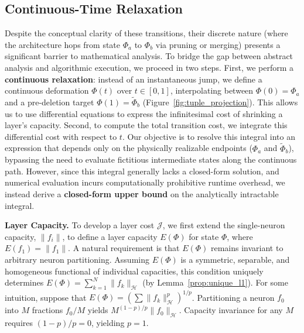 \documentclass[11pt, a4paper, copyright, gdm]{google}
\newcommand{\normshort}[1]{\lVert#1\rVert}
\newcommand{\calH}{\mathcal{H}}
\newcommand{\calJ}{\mathcal{J}}
\theoremstyle{definition}
\begin{document}
\subsection{Continuous-Time Relaxation}
Despite the conceptual clarity of these transitions, their discrete nature (where the architecture hops from state $\Phi_a$ to $\Phi_b$ via pruning or merging) presents a significant barrier to mathematical analysis. To bridge the gap between abstract analysis and algorithmic execution, we proceed in two steps. First, we perform a \textbf{continuous relaxation}: instead of an instantaneous jump, we define a continuous deformation $\Phi(t)$ over $t \in [0,1]$, interpolating between $\Phi(0) = \Phi_a$ and a pre-deletion target $\Phi(1) = \tilde{\Phi}_b$ (Figure~\ref{fig:tuple_projection}). This allows us to use differential equations to express the infinitesimal cost of shrinking a layer's capacity. Second, to compute the total transition cost, we integrate this differential cost with respect to $t$. Our objective is to resolve this integral into an expression that depends only on the physically realizable endpoints ($\Phi_a$ and $\tilde{\Phi}_b$), bypassing the need to evaluate fictitious intermediate states along the continuous path. However, since this integral generally lacks a closed-form solution, and numerical evaluation incurs computationally prohibitive runtime overhead, we instead derive a \textbf{closed-form upper bound} on the analytically intractable integral.

\noindent \textbf{Layer Capacity.} To develop a layer cost $\calJ$, we first extend the single-neuron capacity, $\|f_i\|$, to define a layer capacity $E(\Phi)$ for state $\Phi$, where $E(f_1)=\|f_1\|$. A natural requirement is that $E(\Phi)$ remains invariant to arbitrary neuron partitioning. Assuming $E(\Phi)$ is a symmetric, separable, and homogeneous functional of individual capacities, this condition uniquely determines $E(\Phi) = \sum_{k=1}^N \normshort{f_k}_{\calH}$ (by Lemma~\ref{prop:unique_l1}). For some intuition, suppose that $E(\Phi) = \left(\sum \normshort{f_k}_{\calH}^p\right)^{1/p}$. Partitioning a neuron $f_0$ into $M$ fractions $f_0/M$ yields $M^{(1-p)/p} \normshort{f_0}_\calH$. Capacity invariance for any $M$ requires $(1-p)/p = 0$, yielding $p=1$.
\end{document}
